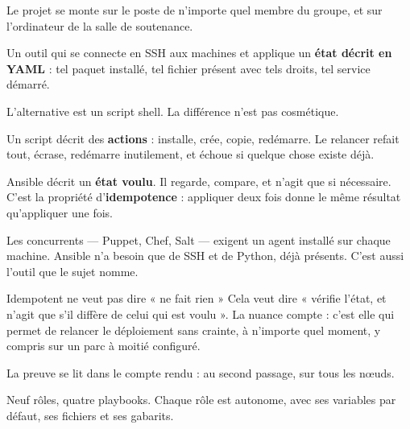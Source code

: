 \apport
Le projet se monte sur le poste de n'importe quel membre du groupe, et sur
l'ordinateur de la salle de soutenance.


\quoi
Un outil qui se connecte en SSH aux machines et applique un \textbf{état décrit
en YAML} : tel paquet installé, tel fichier présent avec tels droits, tel
service démarré.

\pourquoi
L'alternative est un script shell. La différence n'est pas cosmétique.

Un script décrit des \textbf{actions} : installe, crée, copie, redémarre. Le
relancer refait tout, écrase, redémarre inutilement, et échoue si quelque chose
existe déjà.

Ansible décrit un \textbf{état voulu}. Il regarde, compare, et n'agit que si
nécessaire. C'est la propriété d'\textbf{idempotence} : appliquer deux fois
donne le même résultat qu'appliquer une fois.

Les concurrents --- Puppet, Chef, Salt --- exigent un agent installé sur chaque
machine. Ansible n'a besoin que de SSH et de Python, déjà présents. C'est aussi
l'outil que le sujet nomme.

\begin{notion}{Idempotent ne veut pas dire « ne fait rien »}
Cela veut dire « vérifie l'état, et n'agit que s'il diffère de celui qui est
voulu ». La nuance compte : c'est elle qui permet de relancer le déploiement
sans crainte, à n'importe quel moment, y compris sur un parc à moitié
configuré.

La preuve se lit dans le compte rendu : au second passage,  sur
tous les nœuds.
\end{notion}

\role
Neuf rôles, quatre playbooks. Chaque rôle est autonome, avec ses variables par
défaut, ses fichiers et ses gabarits.

